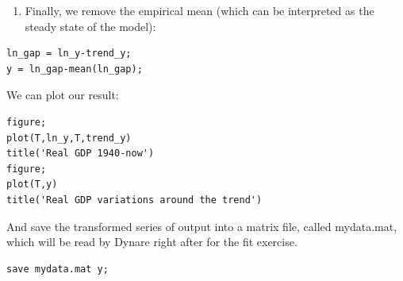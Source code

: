 \documentclass[a4paper,12pt]{article}%
\begin{document}
\begin{enumerate}
\item[c] Finally, we remove the empirical mean (which can be interpreted as
the steady state of the model):
\end{enumerate}

%

\vspace{1ex}
\begin{verbatim}
ln_gap = ln_y-trend_y;
y = ln_gap-mean(ln_gap);
\end{verbatim}
\vspace{1ex}%


We can plot our result:%

\vspace{1ex}
\begin{verbatim}
figure;
plot(T,ln_y,T,trend_y)
title('Real GDP 1940-now')
figure;
plot(T,y)
title('Real GDP variations around the trend')
\end{verbatim}
\vspace{1ex}%


And save the transformed series of output into a matrix file, called
\textsf{mydata.mat}, which will be read by Dynare right after for the fit exercise.%

\vspace{1ex}
\begin{verbatim}
save mydata.mat y;
\end{verbatim}
\vspace{1ex}%
\end{document}
